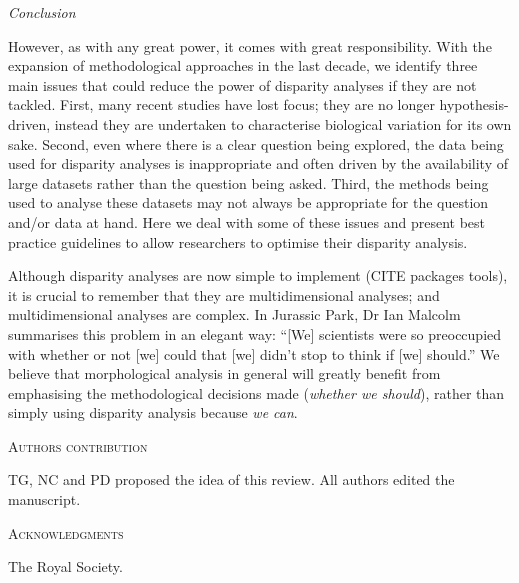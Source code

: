 \documentclass[12pt,letterpaper]{article}
\renewcommand{\section}[1]{%
\bigskip
\begin{center}
\begin{Large}
\normalfont\scshape #1
\medskip
\end{Large}
\end{center}}
\renewcommand{\subsection}[1]{%
\bigskip
\begin{center}
\begin{large}
\normalfont\itshape #1
\end{large}
\end{center}}
\begin{document}
\subsection{Conclusion}
However, as with any great power, it comes with great responsibility. 
With the expansion of methodological approaches in the last decade, we identify three main issues that could reduce the power of disparity analyses if they are not tackled.
First, many recent studies have lost focus; they are no longer hypothesis-driven, instead they are undertaken to characterise biological variation for its own sake.
Second, even where there is a clear question being explored, the data being used for disparity analyses is inappropriate and often driven by the availability of large datasets rather than the question being asked.
Third, the methods being used to analyse these datasets may not always be appropriate for the question and/or data at hand.
Here we deal with some of these issues and present best practice guidelines to allow researchers to optimise their disparity analysis.

Although disparity analyses are now simple to implement (CITE packages tools), it is crucial to remember that they are multidimensional analyses; and multidimensional analyses are complex.
In Jurassic Park, Dr Ian Malcolm summarises this problem in an elegant way: ``[We] scientists were so preoccupied with whether or not [we] could that [we] didn't stop to think if [we] should.''
We believe that morphological analysis in general will greatly benefit from emphasising the methodological decisions made (\textit{whether we should}), rather than simply using disparity analysis because \textit{we can}.



\section{Authors contribution}
TG, NC and PD proposed the idea of this review. All authors edited the manuscript.

\section{Acknowledgments}
The Royal Society.



\end{document}
